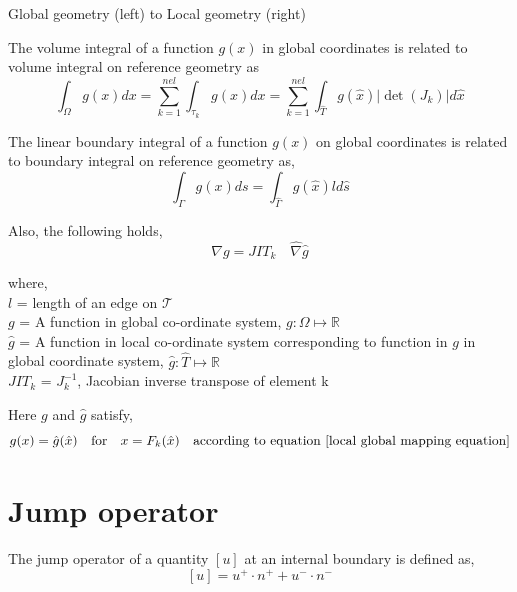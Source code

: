 \documentclass[a4paper,12pt]{book}
\begin{document}
\begin{center}
Global geometry (left) to Local geometry (right)
\end{center}

The volume integral of a function $g(x)$ in global coordinates is related to volume integral on reference geometry as 
\begin{equation}\label{integral_local_global_volume}
\int_\Omega g(x) dx = \sum_{k=1}^{nel} \int_{\tau_k} g(x) dx = \sum_{k=1}^{nel} \int_{\hat{T}} g(\hat{x}) |\det(J_k)| d \hat{x}
\end{equation}

The linear boundary integral of a function $g(x)$ on global coordinates is related to boundary integral on reference geometry as, 
\begin{equation}\label{integral_local_global_boundary}
\int_{\Gamma} g(x) ds = \int_{\hat{\Gamma}} g(\hat{x}) ld \hat{s}
\end{equation}

Also, the following holds,
\begin{equation}\label{derivative_transformation}
\nabla g = JIT_k \quad \hat{\nabla} \hat{g} 
\end{equation}


where,
\\
$l$ = length of an edge on $\mathcal{T}$\\
$g$  = A function in global co-ordinate system, $g:\Omega \mapsto \mathbb{R}$\\
$\hat{g}$  = A function in local co-ordinate system corresponding to function in $g$ in global coordinate system, $\hat{g}:\hat{T} \mapsto \mathbb{R}$\\
$JIT_k$ = $J_k^{-1}$, Jacobian inverse transpose of element k

Here $g$ and $\hat{g}$ satisfy,
\begin{equation}\label{func_transformation}
g(x) = \hat{g}(\hat{x}) \quad \textrm{for}  \quad x = F_k(\hat{x}) \quad \textrm{according to equation \eqref{local global mapping equation}}
\end{equation}

\section{Jump operator}

The jump operator of a quantity $[u]$ at an internal boundary is defined as,
\begin{equation}\label{jump operator}
[u]=u^+ \cdot n^+ + u^- \cdot n^-
\end{equation}
\end{document}
